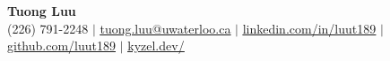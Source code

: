 \documentclass[letterpaper,11pt]{article}
\newif\ifexternal
\begin{document}
\begin{center}
    \textbf{\Huge Tuong Luu} \\ \vspace{1pt}
    \small (226) 791-2248 $|$
    \href{mailto:tm2luu@uwaterloo.ca}{\underline{tuong.luu@uwaterloo.ca}} $|$
    \href{https://linkedin.com/in/luut189}{\underline{linkedin.com/in/luut189}} $|$
    \href{https://github.com/luut189}{\underline{github.com/luut189}} $|$
    \href{https://kyzel.dev/}{\underline{kyzel.dev/}}
\end{center}

\ifexternal
    
    
    
    
\else
    
    
    
    
\fi
\end{document}
